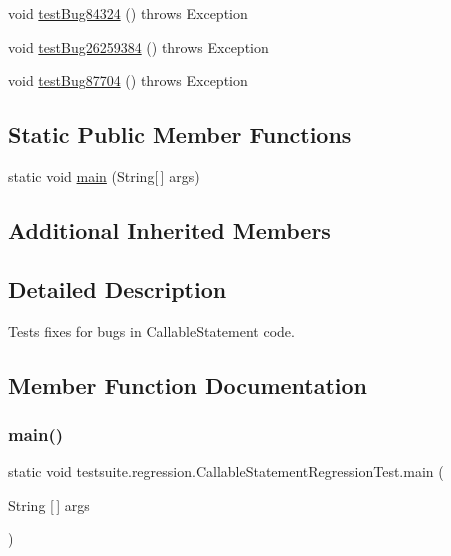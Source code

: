 \begin{DoxyCompactItemize}
\item 
void \mbox{\hyperlink{classtestsuite_1_1regression_1_1_callable_statement_regression_test_a7cc37b690fbb8450333631f6cd408c1d}{test\+Bug84324}} ()  throws Exception 
\item 
void \mbox{\hyperlink{classtestsuite_1_1regression_1_1_callable_statement_regression_test_afda6d8243580dfb952a9b9eeecaa4695}{test\+Bug26259384}} ()  throws Exception 
\item 
void \mbox{\hyperlink{classtestsuite_1_1regression_1_1_callable_statement_regression_test_a1c4d4988218d4f4e3cd1c7e5e84533d0}{test\+Bug87704}} ()  throws Exception 
\end{DoxyCompactItemize}
\subsection*{Static Public Member Functions}
\begin{DoxyCompactItemize}
\item 
static void \mbox{\hyperlink{classtestsuite_1_1regression_1_1_callable_statement_regression_test_a744e4dd9ffdc4244c736939bfe4c98a1}{main}} (String\mbox{[}$\,$\mbox{]} args)
\end{DoxyCompactItemize}
\subsection*{Additional Inherited Members}


\subsection{Detailed Description}
Tests fixes for bugs in Callable\+Statement code. 

\subsection{Member Function Documentation}
\mbox{\label{classtestsuite_1_1regression_1_1_callable_statement_regression_test_a744e4dd9ffdc4244c736939bfe4c98a1}} 
\subsubsection{\texorpdfstring{main()}{main()}}
{\footnotesize\ttfamily static void testsuite.\+regression.\+Callable\+Statement\+Regression\+Test.\+main (\begin{DoxyParamCaption}\item[{String \mbox{[}$\,$\mbox{]}}]{args }\end{DoxyParamCaption})\hspace{0.3cm}{\ttfamily [static]}}

